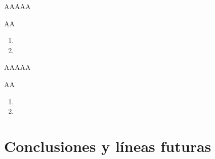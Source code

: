 \documentclass[10pt,spanish,xcolor={svgnames}]{beamer}
\begin{document}
\begin{frame}{AAAAA}
\vspace*{-2em}
\begin{exampleblock}{AA}
\begin{enumerate}
\item
\vspace{1em}
\item\end{enumerate}
\end{exampleblock}
\note{\large \vfill
	\begin{center}
		\begin{enumerate}
			\item  
			\vspace{2em}	
			\item  
			\vspace{2em}
			\item  
			\vspace{2em}
			\vfill
		\end{enumerate}
\end{center}}
\end{frame}


\begin{frame}{AAAAA}
\vspace*{-2em}
\begin{exampleblock}{AA}
\begin{enumerate}
\item
\vspace{1em}
\item\end{enumerate}
\end{exampleblock}
\note{\large \vfill
	\begin{center}
		\begin{enumerate}
			\item  
			\vspace{2em}	
			\item  
			\vspace{2em}
			\item  
			\vspace{2em}
			\vfill
		\end{enumerate}
\end{center}}
\end{frame}

\section{Conclusiones y líneas futuras}
\end{document}
